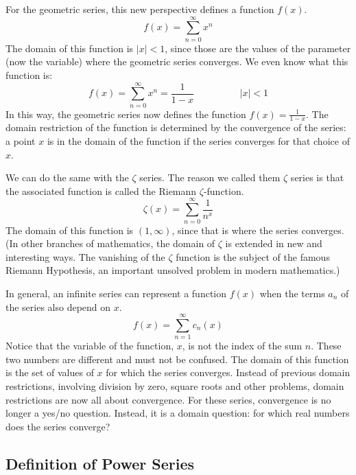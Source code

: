 \documentclass[fleqn]{report}
\begin{document}
For the geometric series, this new perspective defines a
function $f(x)$.
\begin{equation*}
f(x) = \sum_{n=0}^\infty x^n
\end{equation*}
The domain of this function is $|x|<1$, since those are the
values of the parameter (now the variable) where the geometric
series converges. We even know what this function is:
\begin{equation*}
f(x) = \sum_{n=0}^\infty x^n = \frac{1}{1-x} \hspace{2cm} |x|
< 1
\end{equation*}
In this way, the geometric series now defines the function
$f(x) = \frac{1}{1-x}$. The domain restriction of the function
is determined by the convergence of the series: a point $x$ is
in the domain of the function if the series converges for that
choice of $x$.

We can do the same with the $\zeta$ series. The reason we
called them $\zeta$ series is that the associated function is
called the Riemann $\zeta$-function. 
\begin{equation*}
\zeta(x) = \sum_{n=0}^\infty \frac{1}{n^x}
\end{equation*}
The domain of this function is $(1,\infty)$, since that is
where the series converges. (In other branches of
mathematics, the domain of $\zeta$ is extended
in new and interesting ways. The vanishing of the $\zeta$
function is the subject of the famous Riemann Hypothesis, an
important unsolved problem in modern mathematics.) 

In general, an infinite series can represent a function $f(x)$
when the terms $a_n$ of the series also depend on $x$.
\begin{equation*}
f(x) = \sum_{n=1}^\infty c_n(x)
\end{equation*}
Notice that the variable of the function, $x$, is not the index
of the sum $n$. These two numbers are different and must not be
confused. The domain of this function is the set of values of
$x$ for which the series converges. Instead of previous
domain restrictions, involving division by zero, square roots
and other problems, domain restrictions are now all about
convergence. For these series, convergence is no longer a
yes/no question. Instead, it is a domain question: for which
real numbers does the series converge?

\subsection{Definition of Power Series}
\label{power-series-definitions}
\end{document}
